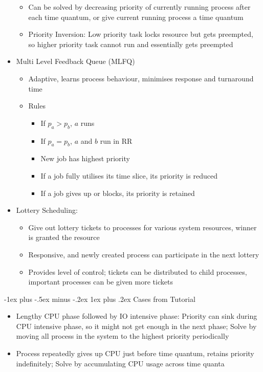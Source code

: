 \documentclass[10pt, landscape]{article}
\makeatletter
\renewcommand{\subsection}{\@startsection{subsection}{3}{0mm}%
                                {-1ex plus -.5ex minus -.2ex}%
                                {1ex plus .2ex}%
                                {\normalfont\small\bfseries}}%
\makeatother
\begin{document}
\begin{multicols*}{3}
\begin{itemize}
\begin{itemize}
        \item Can be solved by decreasing priority of currently running process after each time quantum, or give current running process a time quantum
        \item Priority Inversion: Low priority task locks resource but gets preempted, so higher priority task cannot run and essentially gets preempted
    \end{itemize}
    \item Multi Level Feedback Queue (MLFQ)
    \begin{itemize}
        \item Adaptive, learns process behaviour, minimises response and turnaround time
        \item Rules
        \begin{itemize}
            \item If $p_a>p_b$, $a$ runs
            \item If $p_a=p_b$, $a$ and $b$ run in RR
            \item New job has highest priority
            \item If a job fully utilises its time slice, its priority is reduced
            \item If a job gives up or blocks, its priority is retained
        \end{itemize}
    \end{itemize}
    \item Lottery Scheduling:
    \begin{itemize}
        \item Give out lottery tickets to processes for various system resources, winner is granted the resource
        \item Responsive, and newly created process can participate in the next lottery
        \item Provides level of control; tickets can be distributed to child processes, important processes can be given more tickets
    \end{itemize}
\end{itemize}

\subsection{Cases from Tutorial}
\begin{itemize}
    \item Lengthy CPU phase followed by IO intensive phase: Priority can sink during CPU intensive phase, so it might not get enough in the next phase; Solve by moving all process in the system to the highest priority periodically
    \item Process repeatedly gives up CPU just before time quantum, retains priority indefinitely; Solve by accumulating CPU usage across time quanta
\end{itemize}


\end{multicols*}
\end{document}
